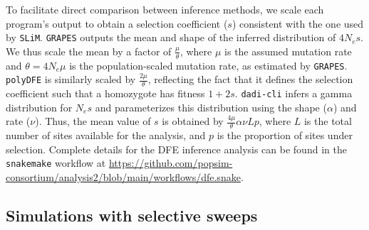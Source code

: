 \documentclass[hidelinks]{article}
\newcommand{\slim}{\texttt{SLiM}\xspace}
\newcommand{\snakemake}{\texttt{snakemake}\xspace}
\newcommand{\polydfe}{\texttt{polyDFE}\xspace}
\newcommand{\dadicli}{\texttt{dadi-cli}\xspace}
\newcommand{\grapes}{\texttt{GRAPES}\xspace}
\begin{document}
    To facilitate direct comparison between inference methods,
    we scale each program's output to obtain a selection coefficient ($s$) consistent with the one used by \slim.
    \grapes outputs the mean and shape of the inferred distribution of $4N_es$.
    We thus scale the mean by a factor of  $\frac{\mu}{\theta}$,
    where $\mu$ is the assumed mutation rate and
    $\theta=4N_{e}\mu$ is the population-scaled mutation rate, as estimated by \grapes.
    \polydfe is similarly scaled by $\frac{2\mu}{\theta}$,
    reflecting the fact that it defines the selection coefficient such that a homozygote has fitness $1+ 2s$.
    \dadicli infers a gamma distribution for $N_es$ and parameterizes this distribution using the shape ($\alpha$) and rate ($\nu$).
    Thus, the mean value of $s$ is obtained by  $\frac{4\mu}{\theta} \alpha \nu L p$,
    where $L$ is the total number of sites available for the analysis,
    and $p$ is the proportion of sites under selection.
    Complete details for the DFE inference analysis can be found in the
    \snakemake workflow at \url{https://github.com/popsim-consortium/analysis2/blob/main/workflows/dfe.snake}.



    \subsection*{Simulations with selective sweeps}
\end{document}
